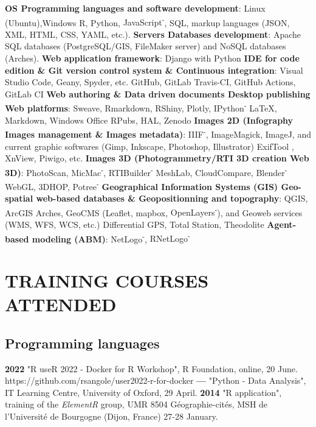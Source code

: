\documentclass{article}
\begin{document}
\textbf{OS {\textbar} Programming languages and software development}: Linux (Ubuntu),Windows \textbf{{\textbar}} \textsf{R}, \textsf{Python}, \textsf{JavaScript\textsuperscript{-}}, SQL, markup languages (JSON, XML, HTML, CSS, YAML, etc.).
\smallbreak
\textbf{Servers {\textbar} Databases development}: Apache \textbf{{\textbar}} SQL databases (PostgreSQL/GIS, FileMaker server) and NoSQL databases (Arches).
\smallbreak
\textbf{Web application framework}: \textsf{Django} with \textsf{Python}
\smallbreak
\textbf{IDE for code edition \& Git version control system \& Continuous integration}: Visual Studio Code, Geany, Spyder, etc. \textbf{{\textbar}} GitHub, GitLab \textbf{{\textbar}} Travis-CI, GitHub Actions, GitLab CI
\smallbreak
\textbf{Web authoring \& Data driven documents {\textbar} Desktop publishing {\textbar} Web platforms}: \textsf{Sweave}, \textsf{Rmarkdown}, \textsf{RShiny}, \textsf{Plotly}, \textsf{IPython\textsuperscript{-}} \textbf{{\textbar}} \LaTeX, \textsf{Markdown}, Windows Office \textbf{{\textbar}} RPubs, HAL, Zenodo
\smallbreak
\textbf{Images 2D (Infography {\textbar} Images management \& Images metadata)}: IIIF\textsuperscript{-}, ImageMagick, ImageJ, and current graphic softwares (Gimp, Inkscape, Photoshop, Illustrator) {\textbar} ExifTool , XnView, Piwigo, etc.
\smallbreak
\textbf{Images 3D (Photogrammetry/RTI {\textbar} 3D creation {\textbar} Web 3D)}: PhotoScan, MicMac\textsuperscript{-}, RTIBuilder\textsuperscript{-} {\textbar} MeshLab, CloudCompare, Blender\textsuperscript{-} \textbf{{\textbar}} WebGL, 3DHOP, Potree\textsuperscript{-}
\smallbreak
\textbf{Geographical Information Systems (GIS) {\textbar} Geo-spatial web-based databases \&  {\textbar} Geopositionning and topography}: QGIS, ArcGIS {\textbar} Arches, GeoCMS (\textsf{Leaflet}, \textsf{mapbox}, \textsf{OpenLayers\textsuperscript{-}}), and Geoweb services (WMS, WFS, WCS, etc.) {\textbar} Differential GPS, Total Station, Theodolite
\smallbreak
\textbf{Agent-based modeling (ABM)}: NetLogo\textsuperscript{-}, \textsf{RNetLogo\textsuperscript{-}}
\smallbreak

\section*{TRAINING COURSES ATTENDED}

\subsection*{Programming languages}

\textbf{2022 }"\textsf{R} useR 2022 - Docker for R Workshop", R Foundation, online, 20 June. https://github.com/rsangole/user2022-r-for-docker
\smallbreak
\textbf{--- }"\textsf{Python} - Data Analysis", IT Learning Centre, University of Oxford, 29 April.
\smallbreak
\textbf{2014 }"\textsf{R} application", training of the \textit{ElementR} group, UMR 8504 G\'{e}ographie-cit\'{e}s, MSH de l'Universit\'{e} de Bourgogne (Dijon, France) 27-28 January.
\smallbreak
\end{document}
